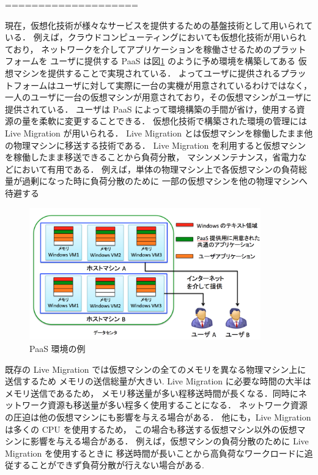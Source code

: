 \documentclass[graduation-thesis]{mlarticle}
\begin{document}
====================





現在，仮想化技術が様々なサービスを提供するための基盤技術として用いられている．
例えば，クラウドコンピューティングにおいても仮想化技術が用いられており，
ネットワークを介してアプリケーションを稼働させるためのプラットフォームを
ユーザに提供する PaaS は図\ref{paas} のように予め環境を構築してある
仮想マシンを提供することで実現されている．
よってユーザに提供されるプラットフォームはユーザに対して実際に一台の実機が用意されているわけではなく，
一人のユーザに一台の仮想マシンが用意されており，その仮想マシンがユーザに提供されている．
ユーザは PaaS によって環境構築の手間が省け，使用する資源の量を柔軟に変更することできる．
仮想化技術で構築された環境の管理には Live Migration が用いられる．
Live Migration とは仮想マシンを稼働したまま他の物理マシンに移送する技術である．
Live Migration を利用すると仮想マシンを稼働したまま移送できることから負荷分散，
マシンメンテナンス，省電力などにおいて有用である．
例えば，単体の物理マシン上で各仮想マシンの負荷総量が過剰になった時に負荷分散のために
一部の仮想マシンを他の物理マシンへ待避する

\begin{figure}[H]\begin{center}\includegraphics[width=10.0cm]{./img/paas.png}\caption{ PaaS 環境の例}\label{paas}\end{center}\end{figure}

既存の Live Migration では仮想マシンの全てのメモリを異なる物理マシン上に送信するため
メモリの送信総量が大きい.
Live Migration に必要な時間の大半はメモリ送信であるため，
メモリ移送量が多い程移送時間が長くなる．同時にネットワーク資源も移送量が多い程多く使用することになる．
ネットワーク資源の圧迫は他の仮想マシンにも影響を与える場合がある．
他にも，Live Migration は多くの CPU を使用するため，
この場合も移送する仮想マシン以外の仮想マシンに影響を与える場合がある\cite{Koto:2012:TUV}．
例えば，仮想マシンの負荷分散のために Live Migration を使用するときに
移送時間が長いことから高負荷なワークロードに追従することができず負荷分散が行えない場合がある.
\end{document}
